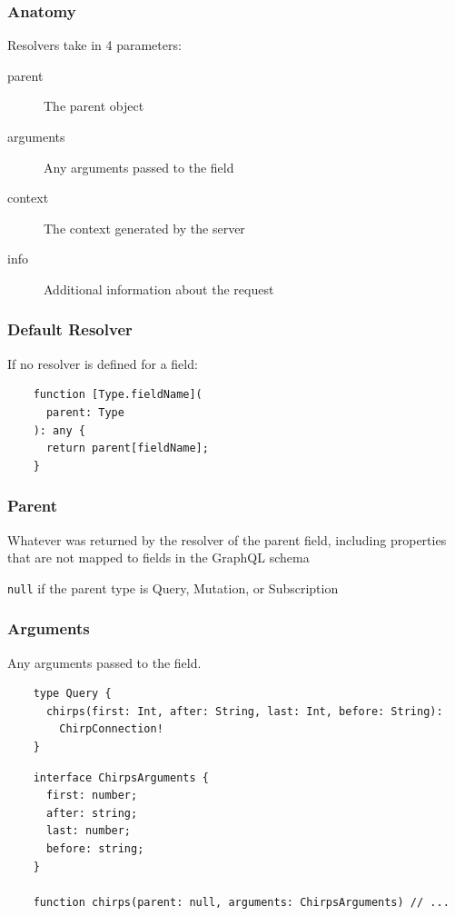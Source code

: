 \documentclass{beamer}
\begin{document}
\begin{frame}
  \frametitle{Anatomy} Resolvers take in 4 parameters:
  \begin{description}
  \item[parent] The parent object
  \item[arguments] Any arguments passed to the field
  \item[context] The context generated by the server
  \item[info] Additional information about the request
  \end{description}
\end{frame}


\begin{frame}[fragile]
  \frametitle{Default Resolver}
  If no resolver is defined for a field:
  \begin{verbatim}
    function [Type.fieldName](
      parent: Type
    ): any {
      return parent[fieldName];
    }
  \end{verbatim}
\end{frame}


\begin{frame}
  \frametitle{Parent}
  Whatever was returned by the resolver of the parent field, including properties that are not mapped to fields in the GraphQL schema

  \vspace{1em}
  \texttt{null} if the parent type is Query, Mutation, or Subscription
\end{frame}


\begin{frame}[fragile]
  \frametitle{Arguments}
  Any arguments passed to the field.

  \begin{verbatim}
    type Query {
      chirps(first: Int, after: String, last: Int, before: String):
        ChirpConnection!
    }
  \end{verbatim}

  \begin{verbatim}
    interface ChirpsArguments {
      first: number;
      after: string;
      last: number;
      before: string;
    }

    function chirps(parent: null, arguments: ChirpsArguments) // ...
  \end{verbatim}
\end{frame}
\end{document}
